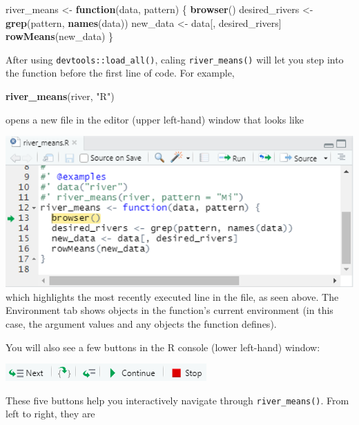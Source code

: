 \documentclass[
]{book}
\newenvironment{Shaded}{\begin{snugshade}}{\end{snugshade}}
\newcommand{\ControlFlowTok}[1]{\textcolor[rgb]{0.13,0.29,0.53}{\textbf{#1}}}
\newcommand{\KeywordTok}[1]{\textcolor[rgb]{0.13,0.29,0.53}{\textbf{#1}}}
\newcommand{\NormalTok}[1]{#1}
\newcommand{\StringTok}[1]{\textcolor[rgb]{0.31,0.60,0.02}{#1}}
\begin{document}
\begin{Shaded}
\begin{Highlighting}[]
\NormalTok{river_means <-}\StringTok{ }\ControlFlowTok{function}\NormalTok{(data, pattern) \{}
  \KeywordTok{browser}\NormalTok{()}
\NormalTok{  desired_rivers <-}\StringTok{ }\KeywordTok{grep}\NormalTok{(pattern, }\KeywordTok{names}\NormalTok{(data))}
\NormalTok{  new_data <-}\StringTok{ }\NormalTok{data[, desired_rivers]}
  \KeywordTok{rowMeans}\NormalTok{(new_data)}
\NormalTok{\}}
\end{Highlighting}
\end{Shaded}

After using \texttt{devtools::load\_all()}, caling \texttt{river\_means()} will let you step into the function before the first line of code. For example,

\begin{Shaded}
\begin{Highlighting}[]
\KeywordTok{river_means}\NormalTok{(river, }\StringTok{"R"}\NormalTok{)}
\end{Highlighting}
\end{Shaded}

opens a new file in the editor (upper left-hand) window that looks like

\includegraphics[width=0.75\linewidth]{images/newrpack_files7_2}
which highlights the most recently executed line in the file, as seen above. The Environment tab shows objects in the function's current environment (in this case, the argument values and any objects the function defines).

You will also see a few buttons in the R console (lower left-hand) window:

\includegraphics[width=0.75\linewidth]{images/newrpack_files8}

These five buttons help you interactively navigate through \texttt{river\_means()}. From left to right, they are
\end{document}
